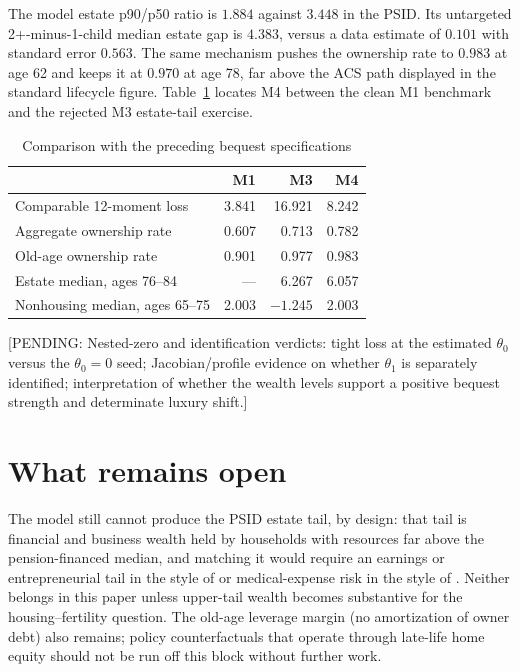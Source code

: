\documentclass[10pt]{article}
\newcommand{\pending}[1]{\textcolor{red!70!black}{[PENDING: #1]}}
\begin{document}
The model estate p90/p50 ratio is $1.884$ against $3.448$ in the PSID. Its
untargeted 2+-minus-1-child median estate gap is $4.383$, versus a data estimate
of $0.101$ with standard error $0.563$. The same mechanism pushes the ownership
rate to $0.983$ at age 62 and keeps it at $0.970$ at age 78, far above the ACS
path displayed in the standard lifecycle figure. Table~\ref{tab:arms} locates
M4 between the clean M1 benchmark and the rejected M3 estate-tail exercise.

\begin{table}[!htb]
\centering
\caption{Comparison with the preceding bequest specifications}\label{tab:arms}
\begin{tabular}{lrrr}
\toprule
 & M1 & M3 & M4 \\
\midrule
Comparable 12-moment loss & 3.841 & 16.921 & 8.242 \\
Aggregate ownership rate & 0.607 & 0.713 & 0.782 \\
Old-age ownership rate & 0.901 & 0.977 & 0.983 \\
Estate median, ages 76--84 & --- & 6.267 & 6.057 \\
Nonhousing median, ages 65--75 & 2.003 & $-1.245$ & 2.003 \\
\bottomrule
\end{tabular}
\end{table}

\pending{Nested-zero and identification verdicts: tight loss at the estimated
$\theta_0$ versus the $\theta_0=0$ seed; Jacobian/profile evidence on whether
$\theta_1$ is separately identified; interpretation of whether the wealth
levels support a positive bequest strength and determinate luxury shift.}

\section{What remains open}

The model still cannot produce the PSID estate tail, by design: that tail is
financial and business wealth held by households with resources far above the
pension-financed median, and matching it would require an earnings or
entrepreneurial tail in the style of \citet{denardi2004} or medical-expense
risk in the style of \citet{denardifrenchjones2010}. Neither belongs in this
paper unless upper-tail wealth becomes substantive for the housing--fertility
question. The old-age leverage margin (no amortization of owner debt) also
remains; policy counterfactuals that operate through late-life home equity
should not be run off this block without further work.
\end{document}
